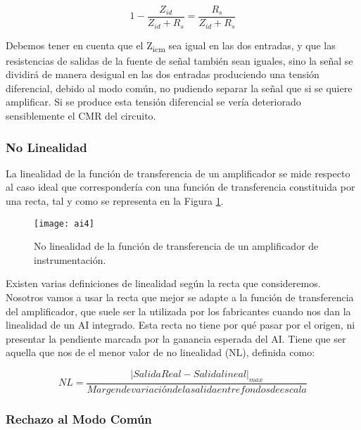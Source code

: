 \begin{equation}\label{eq4}
1 - \frac{Z_{id}}{Z_{id}+R_{s}}= \frac{R_{s}}{Z_{id}+R_{s}}
\end{equation}

Debemos tener en cuenta que el Z\textsubscript{icm} sea igual en las dos entradas, y que las resistencias de salidas de la fuente de señal también sean iguales, sino la señal se dividirá de manera desigual en las dos entradas produciendo una tensión diferencial, debido al modo común, no pudiendo separar la señal que si se quiere amplificar. Si se produce esta tensión diferencial se vería deteriorado sensiblemente el CMR del circuito.


\subsubsection{No Linealidad} %
\label{no_linealidad}

La linealidad de la función de transferencia de un amplificador se mide
respecto al caso ideal que correspondería con una función de transferencia constituida
por una recta, tal y como se representa en la Figura \ref{fig:linealidad}.

\begin{figure}[h]
  \centering
  \texttt{[image: ai4]}
  \caption{No linealidad de la función de transferencia de un amplificador de instrumentación.}\label{fig:linealidad}
\end{figure}

Existen varias definiciones de linealidad según la recta que consideremos. Nosotros vamos a usar la recta que mejor se adapte a la función de transferencia del amplificador, que suele ser la utilizada por los fabricantes cuando nos dan la linealidad de un AI integrado. Esta recta no tiene por qué pasar por el origen, ni presentar la pendiente marcada por la ganancia esperada del AI. Tiene que ser aquella que nos de el menor valor de no linealidad (NL), definida como:

\begin{equation}\label{eq5}
NL = \frac{|Salida Real - Salida lineal|_{max}}{Margen de variación de la salida entre fondos de escala}
\end{equation}


\subsubsection{Rechazo al Modo Común} %
\label{rechazo_CMR}

